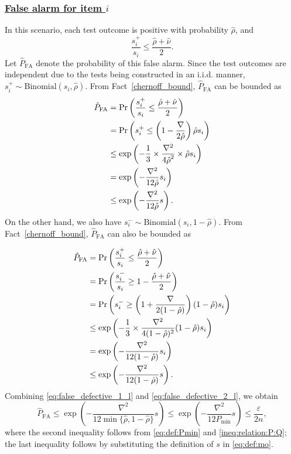 \documentclass[onecolumn,letterpaper]{IEEEtran}
\newcommand{\mo}{{s}}
\newcommand{\moi}{{\mo_{i}}}
\newcommand{\moip}{{\mo_{i}^+}}
\newcommand{\moin}{{\mo_{i}^-}}
\newcommand{\spn}{{\rho}}
\newcommand{\spp}{{\nu}}
\newcommand{\spmin}{{P_{\min}}}
\newcommand{\fdl}{{\hat{P}_{\text{FA}}}}
\newcommand{\spnl}{{\hat{\spn}}}
\newcommand{\sppl}{{\hat{\spp}}}
\newcommand{\spgapl}{{\nabla}}
\begin{document}
\subsubsection{\underline{False alarm for item $i$}} 
In this scenario, each test outcome is positive with probability $\spnl$, and
\begin{equation}
    \frac{\moip}{\moi} \le \frac{\spnl+\sppl}{2}.
\end{equation}
Let $\fdl$ denote the probability of this false alarm. Since the test outcomes are independent due to the tests being constructed in an i.i.d. manner, $\moip \sim \text{Binomial}(\moi,\spnl)$. From Fact~\ref{chernoff_bound}, $\fdl$ can be bounded as
\begin{align}
\label{eq:false_defective_1_l}
\fdl &= \Pr \left( \frac{\moip}{\moi} \le \frac{\spnl+\sppl}{2} \right) \notag\\
&= \Pr \left( \moip \le \left( 1-\frac{\spgapl}{2\spnl} \right) \spnl \moi \right) \notag\\ 
&\le \exp\left( - \frac{1}{3} \times \frac{\spgapl^2}{4\spnl^2} \times \spnl \moi \right) \notag\\ 
&= \exp \left( -\frac{\spgapl^2}{12\spnl} \moi \right) \notag\\
&\le \exp \left( -\frac{\spgapl^2}{12\spnl} \mo \right).
\end{align}
On the other hand, we also have $\moin \sim \text{Binomial} (\moi,1-\spnl)$. From Fact~\ref{chernoff_bound}, $\fdl$ can also be bounded as

\begin{align}
\label{eq:false_defective_2_l}
\fdl &= \Pr \left( \frac{\moip}{\moi} \le \frac{\spnl+\sppl}{2} \right) \notag\\
&= \Pr \left( \frac{\moin}{\moi} \ge 1 - \frac{\spnl+\sppl}{2} \right) \notag\\ 
&= \Pr \left( \moin \ge \left( 1 + \frac{\spgapl}{2(1-\spnl)} \right) (1 - \spnl) \moi \right) \notag\\ 
&\le \exp\left( - \frac{1}{3} \times \frac{\spgapl^2}{4(1-\spnl)^2} (1 - \spnl) \moi \right) \notag\\ 
&= \exp \left( - \frac{\spgapl^2}{12(1-\spnl)} \moi \right) \notag\\
&\le \exp \left( - \frac{\spgapl^2}{12(1-\spnl)} \mo \right).
\end{align}
Combining \eqref{eq:false_defective_1_l} and \eqref{eq:false_defective_2_l}, we obtain
\begin{equation} \label{eq:false_defective_l}
\fdl \le \exp\left( -\frac{\spgapl^2}{12 \min\{\spnl, 1-\spnl\}} \mo \right) \le \exp\left( - \frac{\spgapl^2}{12\spmin} \mo \right) \le \frac{\varepsilon}{2n},
\end{equation}
where the second inequality follows from \eqref{eq:def:Pmin} and \eqref{ineq:relation:P:Q}; the last inequality follows by substituting the definition of $\mo$ in \eqref{eq:def:mo}.  
\end{document}
